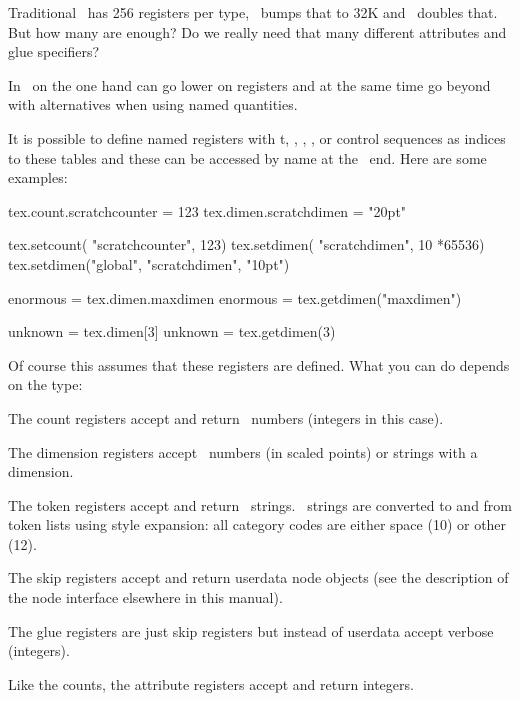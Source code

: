 Traditional \TEX\ has 256 registers per type, \ETEX\ bumps that to 32K and
\LUAMETATEX\ doubles that. But how many are enough? Do we really need that many
different attributes and glue specifiers?

In \LUAMETATEX\ on the one hand can go lower on registers and at the same time
go beyond with alternatives when using named quantities.

It is possible to define named registers with t\type {\attributedef}, \type
{\countdef}, \type {\dimendef}, \type {\skipdef}, \type {\floatdef} or \type
{\toksdef} control sequences as indices to these tables and these can be accessed
by name at the \LUA\ end. Here are some examples:

\starttyping
tex.count.scratchcounter = 123
tex.dimen.scratchdimen   = "20pt"

tex.setcount(          "scratchcounter", 123)
tex.setdimen(          "scratchdimen",   10 *65536)
tex.setdimen("global", "scratchdimen",   "10pt")

enormous = tex.dimen.maxdimen
enormous = tex.getdimen("maxdimen")

unknown = tex.dimen[3]
unknown = tex.getdimen(3)
\stoptyping

Of course this assumes that these registers are defined. What you can do depends
on the type:

\startitemize

    \startitem
        The count registers accept and return \LUA\ numbers (integers in this case).
    \stopitem

    \startitem
        The dimension registers accept \LUA\ numbers (in scaled points) or
        strings with a dimension.
    \stopitem

    \startitem
        The token registers accept and return \LUA\ strings. \LUA\ strings are
        converted to and from token lists using \type {\the \toks} style
        expansion: all category codes are either space (10) or other (12).
    \stopitem

    \startitem
        The skip registers accept and return  userdata node
        objects (see the description of the node interface elsewhere in this
        manual).
    \stopitem

    \startitem
        The glue registers are just skip registers but instead of userdata
        accept verbose (integers).
    \stopitem

    \startitem
        Like the counts, the attribute registers accept and return integers.
    \stopitem


